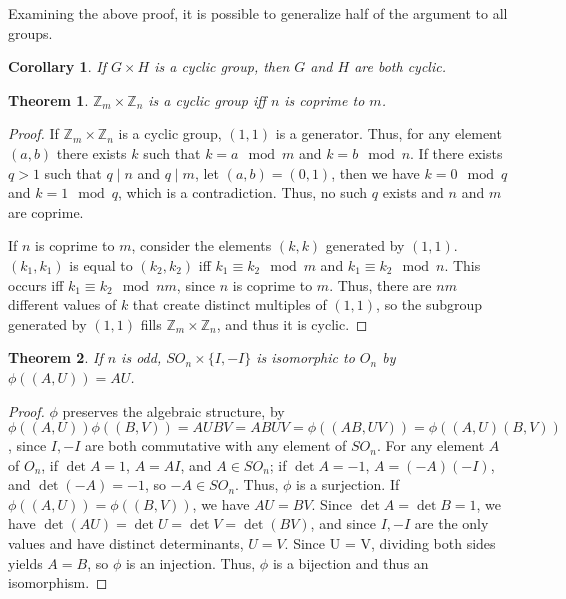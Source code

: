 \documentclass{article}
\newtheorem{theorem}{Theorem}[section]
\newtheorem{corollary}{Corollary}[theorem]
\begin{document}
Examining the above proof, it is possible to generalize half of the argument to all groups.

\begin{corollary}
    If $G \times H$ is a cyclic group, then $G$ and $H$ are both cyclic.
\end{corollary}

\begin{theorem}
    $\mathbb{Z}_{m} \times \mathbb{Z}_{n}$ is a cyclic group iff $n$ is coprime to $m$.
\end{theorem}
\begin{proof}
    If $\mathbb{Z}_m \times \mathbb{Z}_n$ is a cyclic group, $(1,1)$ is a generator.
    Thus, for any element $(a,b)$ there exists $k$ such that
    $k = a \mod m$ and $k = b \mod n$.
    If there exists $q > 1$ such that $q \mid n$ and $q \mid m$,
    let $(a,b) = (0,1)$, then we have $k = 0 \mod q$ and $k = 1 \mod q$,
    which is a contradiction. Thus, no such $q$ exists and $n$ and $m$ are coprime.

    If $n$ is coprime to $m$, consider the elements $(k,k)$ generated by $(1,1)$.
    $(k_{1},k_{1})$ is equal to $(k_{2},k_{2})$ iff $k_{1} \equiv k_{2} \mod m$ and $k_{1} \equiv k_{2} \mod n$.
    This occurs iff $k_{1} \equiv k_{2} \mod nm$, since $n$ is coprime to $m$.
    Thus, there are $nm$ different values of $k$ that create distinct multiples of $(1,1)$,
    so the subgroup generated by $(1,1)$ fills $\mathbb{Z}_m \times \mathbb{Z}_n$, and thus it is cyclic.
\end{proof}

\begin{theorem}
    If $n$ is odd, $SO_n \times \{I,-I\}$ is isomorphic to $O_n$ by $\phi((A,U)) = AU$.
\end{theorem}
\begin{proof}
    $\phi$ preserves the algebraic structure, by
    $\phi((A,U))\phi((B,V)) = AUBV = ABUV = \phi((AB,UV)) = \phi((A,U)(B,V))$, 
    since $I,-I$ are both commutative with any element of $SO_n$.
    For any element $A$ of $O_n$, if $\det A = 1$, $A = AI$, and $A \in SO_{n}$;
    if $\det A = -1$, $A = (-A)(-I)$, and $\det(-A) = -1$, so $-A \in SO_{n}$.
    Thus, $\phi$ is a surjection.
    If $\phi((A,U)) = \phi((B,V))$, we have $AU = BV$.
    Since $\det A = \det B = 1$, we have $\det(AU) = \det U = \det V = \det(BV)$, 
    and since $I,-I$ are the only values and have distinct determinants, $U = V$.
    Since U = V, dividing both sides yields $A = B$, so $\phi$ is an injection.
    Thus, $\phi$ is a bijection and thus an isomorphism.
\end{proof}
\end{document}
